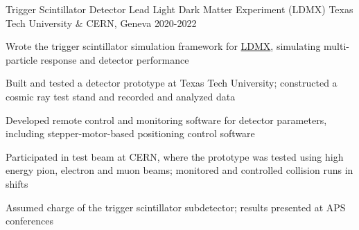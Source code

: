 \begin{cventries}

  \cventry
    {Trigger Scintillator Detector Lead} %
    {Light Dark Matter Experiment (LDMX)} %
    {Texas Tech University \& CERN, Geneva} %
    {2020-2022} %
    {
      \begin{cvitems} %
        \item {Wrote the trigger scintillator simulation framework for \href{https://confluence.slac.stanford.edu/display/MME/Light+Dark+Matter+Experiment}{LDMX}, simulating multi-particle response and detector performance}
        \item {Built and tested a detector prototype at Texas Tech University; constructed a cosmic ray test stand and recorded and analyzed data}
        \item {Developed remote control and monitoring software for detector parameters, including stepper-motor-based positioning control software}
        \item {Participated in test beam at CERN, where the prototype was tested using high energy pion, electron and muon beams; monitored and controlled collision runs in shifts}
        \item {Assumed charge of the trigger scintillator subdetector; results presented at APS conferences}
      \end{cvitems}
    }
\end{cventries}
